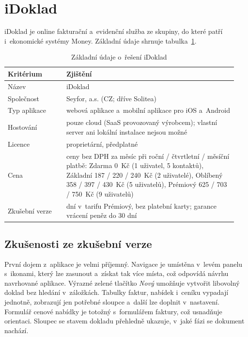 \section{iDoklad}\label{sec:reserse-idoklad}

iDoklad je online fakturační a~evidenční služba ze skupiny, do které patří i~ekonomické systémy Money. Základní údaje shrnuje tabulka~\ref{tab:reserse-idoklad}.

\begin{table}[H]
\centering
\small
\begin{tabular}{>{\raggedright\arraybackslash}p{0.24\linewidth}>{\raggedright\arraybackslash}p{0.70\linewidth}}
\hline
\textbf{Kritérium} & \textbf{Zjištění} \\
\hline
Název & iDoklad \\
Společnost & Seyfor, a.s. (CZ; dříve Solitea) \cite{idoklad-web} \\
Typ aplikace & webová aplikace a~mobilní aplikace pro iOS a~Android \cite{idoklad-web,idoklad-vlastnosti} \\
Hostování & pouze cloud (SaaS provozovaný výrobcem); vlastní server ani lokální instalace nejsou možné \\
Licence & proprietární, předplatné \\
Cena & ceny bez DPH za měsíc při roční / čtvrtletní / měsíční platbě: Zdarma 0~Kč (1 uživatel, 5 kontaktů), Základní 187 / 220 / 240~Kč (2 uživatelé), Oblíbený 358 / 397 / 430~Kč (5 uživatelů), Prémiový 625 / 703 / 750~Kč (9 uživatelů) \cite{idoklad-cenik} \\
Zkušební verze & 60 dní v~tarifu Prémiový, bez platební karty; garance vrácení peněz do 30 dní \cite{idoklad-cenik,idoklad-vlastnosti} \\
\hline
\end{tabular}
\caption{Základní údaje o~řešení iDoklad}\label{tab:reserse-idoklad}
\end{table}

\subsection{Zkušenosti ze zkušební verze}

První dojem z~aplikace je velmi příjemný. Navigace je umístěna v~levém panelu s~ikonami, který lze zasunout a~získat tak více místa, což odpovídá návrhu navrhované aplikace. Výrazné zelené tlačítko \emph{Nový} umožňuje vytvořit libovolný doklad bez hledání v~záložkách. Tabulky faktur, nabídek i~ceníku vypadají jednotně, zobrazují jen potřebné sloupce a~další lze doplnit v~nastavení. Formulář cenové nabídky je totožný s~formulářem faktury, což usnadňuje orientaci. Sloupec se stavem dokladu přehledně ukazuje, v~jaké fázi se dokument nachází.

